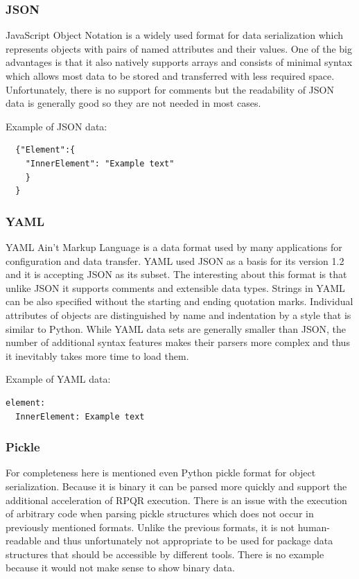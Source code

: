 \subsubsection*{JSON}
JavaScript Object Notation\cite{JSONFormat} is a widely used format for data serialization which represents objects
with pairs of named attributes and their values. One of the big advantages is that it also natively
supports arrays and consists of minimal syntax which allows most data to be stored and transferred
with less required space. Unfortunately, there is no support for comments but the readability of JSON
data is generally good so they are not needed in most cases.

Example of JSON data:
\begin{lstlisting}
  {"Element":{
    "InnerElement": "Example text"
    }
  }
\end{lstlisting}

\subsubsection*{YAML}
YAML\cite{YAMLFormat} Ain't Markup Language is a data format used by many applications for configuration and data
transfer. YAML used JSON as a basis for its version 1.2 and it is accepting JSON as its subset.
The interesting about this format is that unlike JSON it supports comments and extensible data types.
Strings in YAML can be also specified without the starting and ending quotation marks. Individual
attributes of objects are distinguished by name and indentation by a style that is similar to Python. While
YAML data sets are generally smaller than JSON, the number of additional syntax features makes
their parsers more complex and thus it inevitably takes more time to load them.
\newpage

Example of YAML data:
\begin{lstlisting}
element:
  InnerElement: Example text
\end{lstlisting}

\subsubsection*{Pickle}
For completeness here is mentioned even Python pickle format\cite{PickleFormat} for object serialization. Because
it is binary it can be parsed more quickly and support the additional acceleration of RPQR execution.
There is an issue with the execution of arbitrary code when parsing pickle structures which does not
occur in previously mentioned formats. Unlike the previous formats, it is not human-readable
and thus unfortunately not appropriate to be used for package data structures that should be accessible
by different tools.
There is no example because it would not make sense to show binary data.

